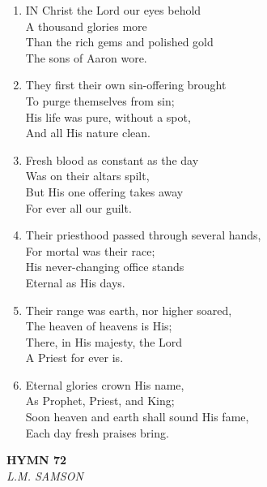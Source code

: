 \documentclass[11pt,a4paper]{article}
\begin{document}
\begin{enumerate}
    \item IN Christ the Lord our eyes behold \\
        A thousand glories more \\
        Than the rich gems and polished gold \\
        The sons of Aaron wore.

    \item They first their own sin-offering brought \\
        To purge themselves from sin; \\
        His life was pure, without a spot, \\
        And all His nature clean.

    \item Fresh blood as constant as the day \\
        Was on their altars spilt, \\
        But His one offering takes away \\
        For ever all our guilt.

    \item Their priesthood passed through several hands, \\
        For mortal was their race; \\
        His never-changing office stands \\
        Eternal as His days.

    \item Their range was earth, nor higher soared, \\
        The heaven of heavens is His; \\
        There, in His majesty, the Lord \\
        A Priest for ever is.

    \item Eternal glories crown His name, \\
        As Prophet, Priest, and King; \\
        Soon heaven and earth shall sound His fame, \\
        Each day fresh praises bring.

\end{enumerate}

\newpage
\begin{center}
    {\Large \textbf{HYMN 72}}
    \\
    \textit{L.M. SAMSON}
\end{center}
\vspace{1em}
\end{document}

